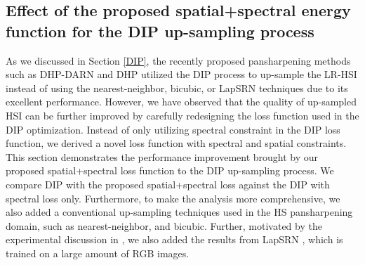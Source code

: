 \documentclass[journal]{IEEEtran}
\begin{document}
    \subsection{Effect of the proposed spatial+spectral energy function for the DIP up-sampling process} 
    \label{results_upsample}
    As we discussed in Section \ref{DIP}, the recently proposed pansharpening methods such as DHP-DARN \cite{DHP-DARN} and DHP \cite{DeepHyperspectralPrior} utilized the DIP process to up-sample the LR-HSI instead of using the nearest-neighbor, bicubic, or LapSRN techniques due to its excellent performance. However, we have observed that the quality of up-sampled HSI can be further improved by carefully redesigning the loss function used in the DIP optimization. Instead of only utilizing spectral constraint in the DIP loss function, we derived a novel loss function with spectral and spatial constraints. This section demonstrates the performance improvement brought by our proposed spatial+spectral loss function to the DIP up-sampling process. We compare DIP with the  proposed spatial+spectral loss against the DIP with spectral loss only. Furthermore, to make the analysis more comprehensive,  we also added a conventional up-sampling techniques used in the HS pansharpening domain, such as nearest-neighbor, and bicubic. Further, motivated by the experimental discussion in \cite{DHP-DARN}, we also added the results from LapSRN \cite{LapSRN}, which is trained on a large amount of RGB images.
    
\end{document}
